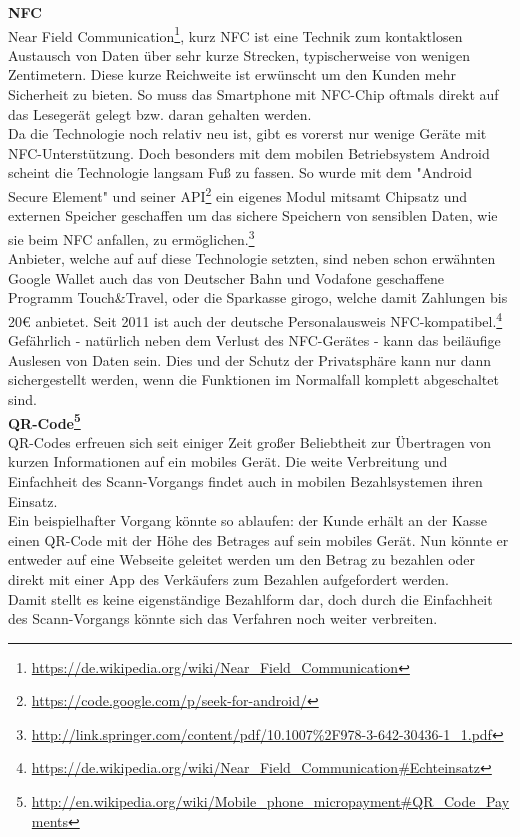 \textbf{NFC}\\
Near Field Communication\footnote{\url{https://de.wikipedia.org/wiki/Near_Field_Communication}}, kurz NFC ist eine Technik zum kontaktlosen Austausch von Daten über sehr kurze Strecken, typischerweise von wenigen Zentimetern. Diese kurze Reichweite ist erwünscht um den Kunden mehr Sicherheit zu bieten. So muss das Smartphone mit NFC-Chip oftmals direkt auf das Lesegerät gelegt bzw. daran gehalten werden. \\
Da die Technologie noch relativ neu ist, gibt es vorerst nur wenige Geräte mit NFC-Unterstützung. Doch besonders mit dem mobilen Betriebsystem Android scheint die Technologie langsam Fuß zu fassen. So wurde mit dem "Android Secure Element" und seiner API\footnote{\url{https://code.google.com/p/seek-for-android/}} ein eigenes Modul mitsamt Chipsatz und externen Speicher geschaffen um das sichere Speichern von sensiblen Daten, wie sie beim NFC anfallen, zu ermöglichen.\footnote{\url{http://link.springer.com/content/pdf/10.1007\%2F978-3-642-30436-1_1.pdf}}\\
Anbieter, welche auf auf diese Technologie setzten, sind neben schon erwähnten Google Wallet auch das von Deutscher Bahn und Vodafone geschaffene Programm Touch\&Travel, oder die Sparkasse girogo, welche damit Zahlungen bis 20€ anbietet.
Seit 2011 ist auch der deutsche Personalausweis NFC-kompatibel.\footnote{\url{https://de.wikipedia.org/wiki/Near_Field_Communication\#Echteinsatz}}\\
Gefährlich - natürlich neben dem Verlust des NFC-Gerätes - kann das beiläufige Auslesen von Daten sein. Dies und der Schutz der Privatsphäre kann nur dann sichergestellt werden, wenn die Funktionen im Normalfall komplett abgeschaltet sind.\\

\textbf{QR-Code\footnote{\url{http://en.wikipedia.org/wiki/Mobile_phone_micropayment\#QR_Code_Payments}}}\\
QR-Codes erfreuen sich seit einiger Zeit großer Beliebtheit zur Übertragen von kurzen Informationen auf ein mobiles Gerät. Die weite Verbreitung und Einfachheit des Scann-Vorgangs findet auch in mobilen Bezahlsystemen ihren Einsatz. \\
Ein beispielhafter Vorgang könnte so ablaufen: der Kunde erhält an der Kasse einen QR-Code mit der Höhe des Betrages auf sein mobiles Gerät. Nun könnte er entweder auf eine Webseite geleitet werden um den Betrag zu bezahlen oder direkt mit einer App des Verkäufers zum Bezahlen aufgefordert werden.\\
Damit stellt es keine eigenständige Bezahlform dar, doch durch die Einfachheit des Scann-Vorgangs könnte sich das Verfahren noch weiter verbreiten. 